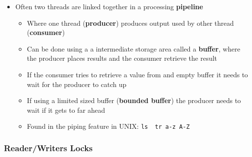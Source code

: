 \documentclass[11pt]{article}
\providecommand{\tightlist}{%
      \setlength{\itemsep}{0pt}\setlength{\parskip}{0pt}}
\begin{document}
\begin{itemize}
\tightlist
\item
  Often two threads are linked together in a processing
  \textbf{pipeline}

  \begin{itemize}
  \tightlist
  \item
    Where one thread (\textbf{producer}) produces output used by other
    thread (\textbf{consumer})
  \item
    Can be done using a a intermediate storage area called a
    \textbf{buffer}, where the producer places results and the consumer
    retrieve the result
  \item
    If the consumer tries to retrieve a value from and empty buffer it
    needs to wait for the producer to catch up
  \item
    If using a limited sized buffer (\textbf{bounded buffer}) the
    producer needs to wait if it gets to far ahead
  \item
    Found in the piping feature in UNIX:
    \texttt{ls\ \textbar{}\ tr\ a-z\ A-Z}
  \end{itemize}
\end{itemize}

    \subsubsection{Reader/Writers Locks}\label{readerwriters-locks}
\end{document}
